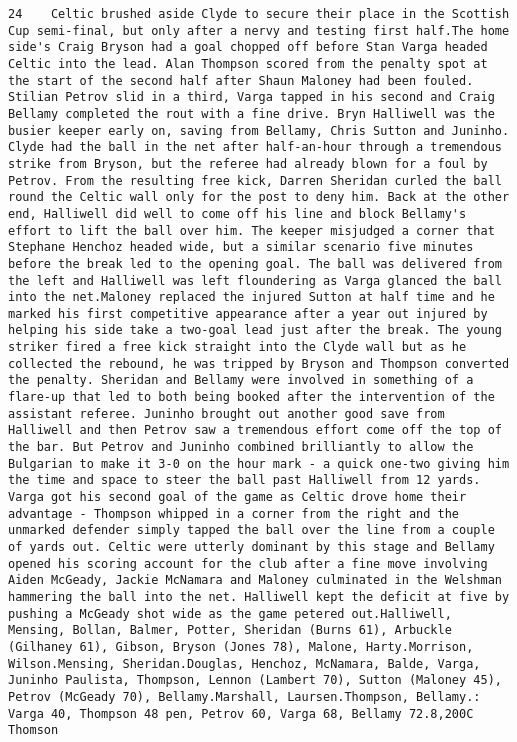 \documentclass[11pt]{article}
\begin{document}
\begin{Verbatim}[commandchars=\\\{\}]
         24    Celtic brushed aside Clyde to secure their place in the Scottish Cup semi-final, but only after a nervy and testing first half.The home side's Craig Bryson had a goal chopped off before Stan Varga headed Celtic into the lead. Alan Thompson scored from the penalty spot at the start of the second half after Shaun Maloney had been fouled. Stilian Petrov slid in a third, Varga tapped in his second and Craig Bellamy completed the rout with a fine drive. Bryn Halliwell was the busier keeper early on, saving from Bellamy, Chris Sutton and Juninho. Clyde had the ball in the net after half-an-hour through a tremendous strike from Bryson, but the referee had already blown for a foul by Petrov. From the resulting free kick, Darren Sheridan curled the ball round the Celtic wall only for the post to deny him. Back at the other end, Halliwell did well to come off his line and block Bellamy's effort to lift the ball over him. The keeper misjudged a corner that Stephane Henchoz headed wide, but a similar scenario five minutes before the break led to the opening goal. The ball was delivered from the left and Halliwell was left floundering as Varga glanced the ball into the net.Maloney replaced the injured Sutton at half time and he marked his first competitive appearance after a year out injured by helping his side take a two-goal lead just after the break. The young striker fired a free kick straight into the Clyde wall but as he collected the rebound, he was tripped by Bryson and Thompson converted the penalty. Sheridan and Bellamy were involved in something of a flare-up that led to both being booked after the intervention of the assistant referee. Juninho brought out another good save from Halliwell and then Petrov saw a tremendous effort come off the top of the bar. But Petrov and Juninho combined brilliantly to allow the Bulgarian to make it 3-0 on the hour mark - a quick one-two giving him the time and space to steer the ball past Halliwell from 12 yards. Varga got his second goal of the game as Celtic drove home their advantage - Thompson whipped in a corner from the right and the unmarked defender simply tapped the ball over the line from a couple of yards out. Celtic were utterly dominant by this stage and Bellamy opened his scoring account for the club after a fine move involving Aiden McGeady, Jackie McNamara and Maloney culminated in the Welshman hammering the ball into the net. Halliwell kept the deficit at five by pushing a McGeady shot wide as the game petered out.Halliwell, Mensing, Bollan, Balmer, Potter, Sheridan (Burns 61), Arbuckle (Gilhaney 61), Gibson, Bryson (Jones 78), Malone, Harty.Morrison, Wilson.Mensing, Sheridan.Douglas, Henchoz, McNamara, Balde, Varga, Juninho Paulista, Thompson, Lennon (Lambert 70), Sutton (Maloney 45), Petrov (McGeady 70), Bellamy.Marshall, Laursen.Thompson, Bellamy.: Varga 40, Thompson 48 pen, Petrov 60, Varga 68, Bellamy 72.8,200C Thomson                                                                                                                                                                                                                                                                                                                                                                      
\end{Verbatim}
\end{document}
